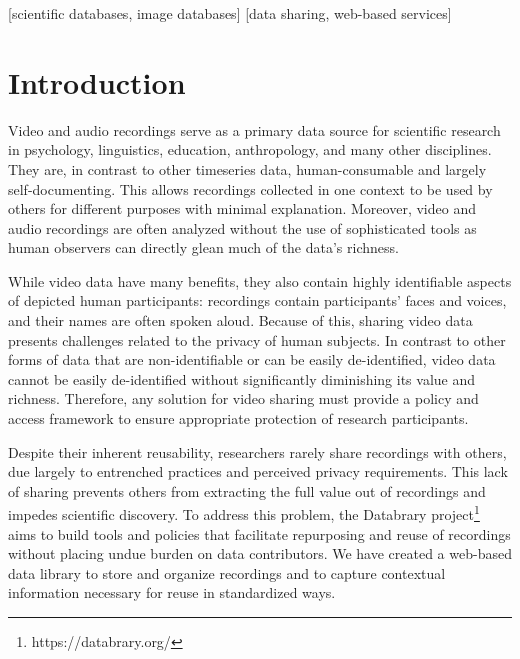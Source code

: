 \documentclass{sig-alternate-2013}
\begin{document}
[scientific databases, image databases]
[data sharing, web-based services]



\break
\section{Introduction}

Video and audio recordings serve as a primary data source for scientific research in psychology, linguistics, education, anthropology, and many other disciplines.
They are, in contrast to other timeseries data, human-consumable and largely self-documenting. 
This allows recordings collected in one context to be used by others for different purposes with minimal explanation.
Moreover, video and audio recordings are often analyzed without the use of sophisticated tools as human observers can directly glean much of the data's richness.

While video data have many benefits, they also contain highly identifiable aspects of depicted human participants: recordings contain participants' faces and voices, and their names are often spoken aloud.
Because of this, sharing video data presents challenges related to the privacy of human subjects.
In contrast to other forms of data that are non-identifiable or can be easily de-identified, video data cannot be easily de-identified without significantly diminishing its value and richness. 
Therefore, any solution for video sharing must provide a policy and access framework to ensure appropriate protection of research participants.

Despite their inherent reusability, researchers rarely share recordings with others, due largely to entrenched practices and perceived privacy requirements.
This lack of sharing prevents others from extracting the full value out of recordings and impedes scientific discovery.
To address this problem, the Databrary project\footnote{https://databrary.org/} aims to build tools and policies that facilitate repurposing and reuse of recordings without placing undue burden on data contributors.
We have created a web-based data library to store and organize recordings and to capture contextual information necessary for reuse in standardized ways.
\end{document}
